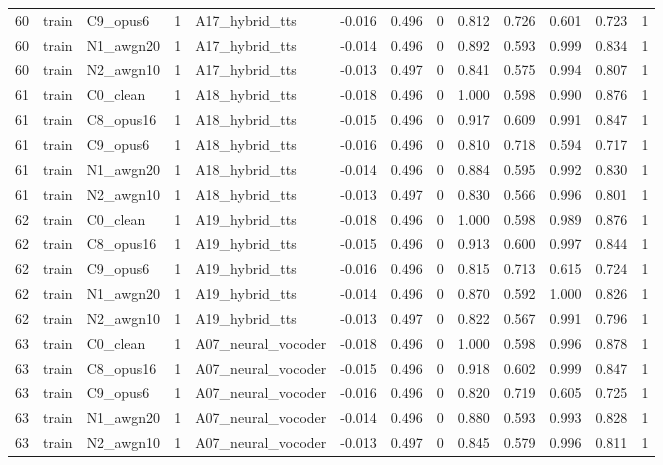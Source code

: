 \begin{tabular}{rllrlrrrrrrrr}
60 & train & C9_opus6 & 1 & A17_hybrid_tts & -0.016 & 0.496 & 0 & 0.812 & 0.726 & 0.601 & 0.723 & 1 \\
60 & train & N1_awgn20 & 1 & A17_hybrid_tts & -0.014 & 0.496 & 0 & 0.892 & 0.593 & 0.999 & 0.834 & 1 \\
60 & train & N2_awgn10 & 1 & A17_hybrid_tts & -0.013 & 0.497 & 0 & 0.841 & 0.575 & 0.994 & 0.807 & 1 \\
61 & train & C0_clean & 1 & A18_hybrid_tts & -0.018 & 0.496 & 0 & 1.000 & 0.598 & 0.990 & 0.876 & 1 \\
61 & train & C8_opus16 & 1 & A18_hybrid_tts & -0.015 & 0.496 & 0 & 0.917 & 0.609 & 0.991 & 0.847 & 1 \\
61 & train & C9_opus6 & 1 & A18_hybrid_tts & -0.016 & 0.496 & 0 & 0.810 & 0.718 & 0.594 & 0.717 & 1 \\
61 & train & N1_awgn20 & 1 & A18_hybrid_tts & -0.014 & 0.496 & 0 & 0.884 & 0.595 & 0.992 & 0.830 & 1 \\
61 & train & N2_awgn10 & 1 & A18_hybrid_tts & -0.013 & 0.497 & 0 & 0.830 & 0.566 & 0.996 & 0.801 & 1 \\
62 & train & C0_clean & 1 & A19_hybrid_tts & -0.018 & 0.496 & 0 & 1.000 & 0.598 & 0.989 & 0.876 & 1 \\
62 & train & C8_opus16 & 1 & A19_hybrid_tts & -0.015 & 0.496 & 0 & 0.913 & 0.600 & 0.997 & 0.844 & 1 \\
62 & train & C9_opus6 & 1 & A19_hybrid_tts & -0.016 & 0.496 & 0 & 0.815 & 0.713 & 0.615 & 0.724 & 1 \\
62 & train & N1_awgn20 & 1 & A19_hybrid_tts & -0.014 & 0.496 & 0 & 0.870 & 0.592 & 1.000 & 0.826 & 1 \\
62 & train & N2_awgn10 & 1 & A19_hybrid_tts & -0.013 & 0.497 & 0 & 0.822 & 0.567 & 0.991 & 0.796 & 1 \\
63 & train & C0_clean & 1 & A07_neural_vocoder & -0.018 & 0.496 & 0 & 1.000 & 0.598 & 0.996 & 0.878 & 1 \\
63 & train & C8_opus16 & 1 & A07_neural_vocoder & -0.015 & 0.496 & 0 & 0.918 & 0.602 & 0.999 & 0.847 & 1 \\
63 & train & C9_opus6 & 1 & A07_neural_vocoder & -0.016 & 0.496 & 0 & 0.820 & 0.719 & 0.605 & 0.725 & 1 \\
63 & train & N1_awgn20 & 1 & A07_neural_vocoder & -0.014 & 0.496 & 0 & 0.880 & 0.593 & 0.993 & 0.828 & 1 \\
63 & train & N2_awgn10 & 1 & A07_neural_vocoder & -0.013 & 0.497 & 0 & 0.845 & 0.579 & 0.996 & 0.811 & 1 \\

\end{tabular}
